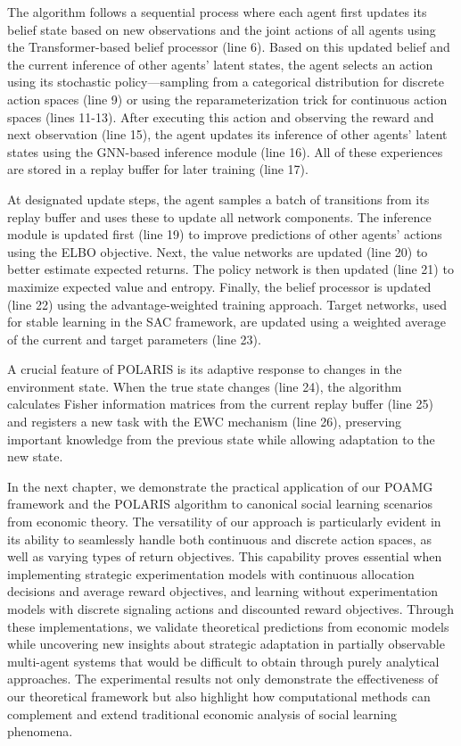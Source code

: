 The algorithm follows a sequential process where each agent first updates its belief state based on new observations and the joint actions of all agents using the Transformer-based belief processor (line 6). Based on this updated belief and the current inference of other agents' latent states, the agent selects an action using its stochastic policy—sampling from a categorical distribution for discrete action spaces (line 9) or using the reparameterization trick for continuous action spaces (lines 11-13). After executing this action and observing the reward and next observation (line 15), the agent updates its inference of other agents' latent states using the GNN-based inference module (line 16). All of these experiences are stored in a replay buffer for later training (line 17).

At designated update steps, the agent samples a batch of transitions from its replay buffer and uses these to update all network components. The inference module is updated first (line 19) to improve predictions of other agents' actions using the ELBO objective. Next, the value networks are updated (line 20) to better estimate expected returns. The policy network is then updated (line 21) to maximize expected value and entropy. Finally, the belief processor is updated (line 22) using the advantage-weighted training approach. Target networks, used for stable learning in the SAC framework, are updated using a weighted average of the current and target parameters (line 23).

A crucial feature of POLARIS is its adaptive response to changes in the environment state. When the true state changes (line 24), the algorithm calculates Fisher information matrices from the current replay buffer (line 25) and registers a new task with the EWC mechanism (line 26), preserving important knowledge from the previous state while allowing adaptation to the new state.

In the next chapter, we demonstrate the practical application of our POAMG framework and the POLARIS algorithm to canonical social learning scenarios from economic theory. The versatility of our approach is particularly evident in its ability to seamlessly handle both continuous and discrete action spaces, as well as varying types of return objectives. This capability proves essential when implementing strategic experimentation models with continuous allocation decisions and average reward objectives, and learning without experimentation models with discrete signaling actions and discounted reward objectives. Through these implementations, we validate theoretical predictions from economic models while uncovering new insights about strategic adaptation in partially observable multi-agent systems that would be difficult to obtain through purely analytical approaches. The experimental results not only demonstrate the effectiveness of our theoretical framework but also highlight how computational methods can complement and extend traditional economic analysis of social learning phenomena.

